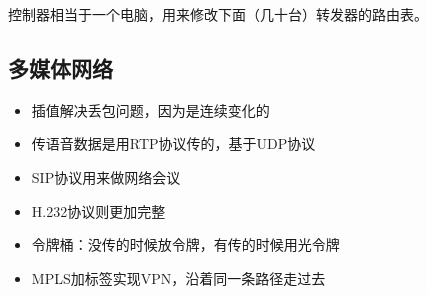\begin{center}
\end{center}

控制器相当于一个电脑，用来修改下面（几十台）转发器的路由表。

\subsection{多媒体网络}
\begin{itemize}
\item 插值解决丢包问题，因为是连续变化的
\item 传语音数据是用RTP协议传的，基于UDP协议
\item SIP协议用来做网络会议
\item H.232协议则更加完整
\item 令牌桶：没传的时候放令牌，有传的时候用光令牌
\item MPLS加标签实现VPN，沿着同一条路径走过去
\end{itemize}